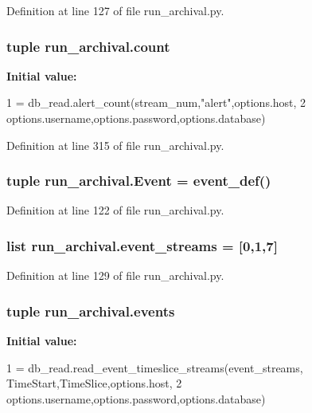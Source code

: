 Definition at line 127 of file run\-\_\-archival.\-py.

\hypertarget{namespacerun__archival_ab4dad5a97c86185353fedf0feefa562e}{
\subsubsection[{count}]{\setlength{\rightskip}{0pt plus 5cm}tuple run\-\_\-archival.\-count}}\label{namespacerun__archival_ab4dad5a97c86185353fedf0feefa562e}
{\bfseries Initial value\-:}
\begin{DoxyCode}
1 = db\_read.alert\_count(stream\_num,\textcolor{stringliteral}{"alert"},options.host,
2                            options.username,options.password,options.database)
\end{DoxyCode}


Definition at line 315 of file run\-\_\-archival.\-py.

\hypertarget{namespacerun__archival_a81b9709cc3c8589bfc7ecd72c354cba6}{
\subsubsection[{Event}]{\setlength{\rightskip}{0pt plus 5cm}tuple run\-\_\-archival.\-Event = event\-\_\-def()}}\label{namespacerun__archival_a81b9709cc3c8589bfc7ecd72c354cba6}


Definition at line 122 of file run\-\_\-archival.\-py.

\hypertarget{namespacerun__archival_a175f39c7d10885511c4623d3425db6ba}{
\subsubsection[{event\-\_\-streams}]{\setlength{\rightskip}{0pt plus 5cm}list run\-\_\-archival.\-event\-\_\-streams = \mbox{[}0,1,7\mbox{]}}}\label{namespacerun__archival_a175f39c7d10885511c4623d3425db6ba}


Definition at line 129 of file run\-\_\-archival.\-py.

\hypertarget{namespacerun__archival_a46a929fd7b61c93a6bf4aa010103b238}{
\subsubsection[{events}]{\setlength{\rightskip}{0pt plus 5cm}tuple run\-\_\-archival.\-events}}\label{namespacerun__archival_a46a929fd7b61c93a6bf4aa010103b238}
{\bfseries Initial value\-:}
\begin{DoxyCode}
1 = db\_read.read\_event\_timeslice\_streams(event\_streams, TimeStart,TimeSlice,options.host,
2                                     options.username,options.password,options.database)
\end{DoxyCode}


